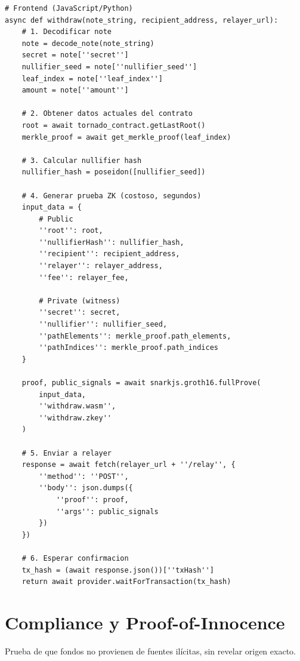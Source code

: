 \documentclass[11pt,a4paper,twoside]{book}
\begin{document}
\begin{example}
\begin{lstlisting}[style=python]
# Frontend (JavaScript/Python)
async def withdraw(note_string, recipient_address, relayer_url):
    # 1. Decodificar note
    note = decode_note(note_string)
    secret = note[''secret'']
    nullifier_seed = note[''nullifier_seed'']
    leaf_index = note[''leaf_index'']
    amount = note[''amount'']
    
    # 2. Obtener datos actuales del contrato
    root = await tornado_contract.getLastRoot()
    merkle_proof = await get_merkle_proof(leaf_index)
    
    # 3. Calcular nullifier hash
    nullifier_hash = poseidon([nullifier_seed])
    
    # 4. Generar prueba ZK (costoso, segundos)
    input_data = {
        # Public
        ''root'': root,
        ''nullifierHash'': nullifier_hash,
        ''recipient'': recipient_address,
        ''relayer'': relayer_address,
        ''fee'': relayer_fee,
        
        # Private (witness)
        ''secret'': secret,
        ''nullifier'': nullifier_seed,
        ''pathElements'': merkle_proof.path_elements,
        ''pathIndices'': merkle_proof.path_indices
    }
    
    proof, public_signals = await snarkjs.groth16.fullProve(
        input_data,
        ''withdraw.wasm'',
        ''withdraw.zkey''
    )
    
    # 5. Enviar a relayer
    response = await fetch(relayer_url + ''/relay'', {
        ''method'': ''POST'',
        ''body'': json.dumps({
            ''proof'': proof,
            ''args'': public_signals
        })
    })
    
    # 6. Esperar confirmacion
    tx_hash = (await response.json())[''txHash'']
    return await provider.waitForTransaction(tx_hash)
\end{lstlisting}
\end{example}

\section{Compliance y Proof-of-Innocence}

\begin{definition}
Prueba de que fondos no provienen de fuentes il\'icitas, sin revelar origen exacto.
\end{definition}
\end{document}
